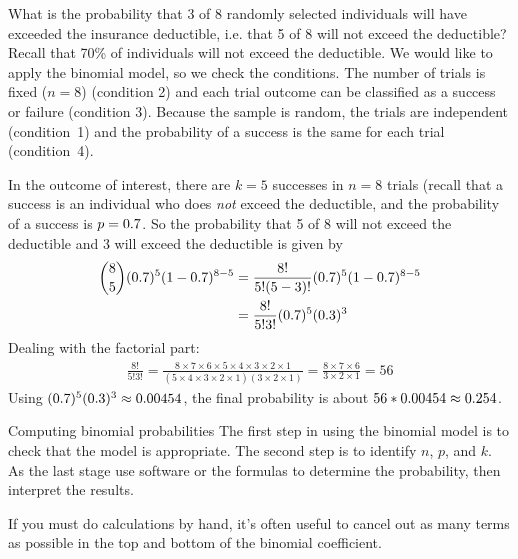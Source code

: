\begin{examplewrap}
\begin{nexample}{What is the probability that 3 of 8 randomly
    selected individuals will have exceeded the insurance
    deductible, i.e. that 5 of 8 will not exceed the deductible?
    Recall that 70\% of individuals will not exceed the
    deductible.}
  We would like to apply the binomial model,
  so we check the conditions.
  The number of trials is fixed ($n = 8$) (condition 2)
  and each trial outcome can be classified as a success
  or failure (condition 3).
  Because the sample is random, the trials are independent
  (condition~1) and the probability of a success is the same
  for each trial (condition~4).

  In the outcome of interest, there are $k = 5$ successes
  in $n = 8$ trials (recall that a success is an individual
  who does \emph{not} exceed the deductible, and the
  probability of a success is $p = 0.7{}$.
  So the probability that 5 of 8 will not exceed the
  deductible and 3 will exceed the deductible is given by
  \begin{align*}
  { 8 \choose 5}(0.7{})^5
  (1-0.7{})^{8-5}
    &= \frac{8!}{5!(5-3)!}
        (0.7{})^5(1-0.7{})^{8-5} \\
    &= \frac{8!}{5!3!}
        (0.7{})^5(0.3{})^3
  \end{align*}
  Dealing with the factorial part:
  \begin{align*}
  \frac{8!}{5!3!}
    = \frac{8\times7\times6\times5\times4\times3\times2\times1}
        {(5\times4\times3\times2\times1)(3\times2\times1)}
    = \frac{8\times7\times6}{3\times2\times1}
    = 56
  \end{align*}
  Using $(0.7{})^5(0.3{})^3
    \approx 0.00454{}$,
  the final probability is about
  $56 * 0.00454{}
    \approx 0.254{}$.
\end{nexample}
\end{examplewrap}

\begin{onebox}{Computing binomial probabilities}
  The first step in using the binomial model is to check
  that the model is appropriate.
  The second step is to identify $n$, $p$, and $k$.
  As the last stage use software or the formulas
  to determine the probability, then interpret the results.%
  \vspace{3mm}

  If you must do calculations by hand, it's often useful
  to cancel out as many terms as possible in the top and
  bottom of the binomial coefficient.
\end{onebox}

